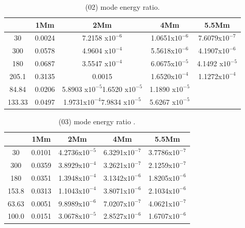 \documentclass[final,1p]{elsarticle}
\begin{document}
\begin{table}
\centering
\begin{tabular}{c c c c c }
\hline
   &  1Mm & 2Mm & 4Mm & 5.5Mm \\
\hline
30 &  0.0024 & 7.2158 x$10^{-6}$ & 1.0651x$10^{-6}$ & 7.6079x$10^{-7}$\\
\hline
300 & 0.0578 & 4.9604 x$10^{-4}$ & 5.5618x$10^{-6}$ & 4.1907x$10^{-6}$\\
\hline
180 & 0.0687 & 3.5547 x$10^{-4}$ & 6.0675x$10^{-5}$ & 4.1492 x$10^{-5}$\\
\hline
205.1 & 0.3135 & 0.0015 &1.6520x$10^{-4}$ & 1.1272x$10^{-4}$\\
\hline
84.84 & 0.0206 &5.8903 x$10^{-5}$1.6520 x$10^{-5}$ & 1.1890 x$10^{-5}$\\
\hline
133.33 & 0.0497 & 1.9731x$10^{-4}$7.9834 x$10^{-5}$ & 5.6267 x$10^{-5}$\\
\hline
\end{tabular} 
\caption{ (02) mode energy ratio.}
\end{table}




\begin{table}
\centering
\begin{tabular}{c c c c c }
\hline
   &  1Mm & 2Mm & 4Mm & 5.5Mm \\
\hline
30 &  0.0101 &  4.2736x$10^{-5}$ & 6.3291x$10^{-7}$ & 3.7786x$10^{-7}$\\
\hline
300 & 0.0359 & 3.8929x$10^{-4}$ & 3.2621x$10^{-7}$ & 2.1259x$10^{-7}$\\
\hline
180 & 0.0351 &1.3948x$10^{-4}$ & 3.1342x$10^{-6}$ & 1.8205x$10^{-6}$\\
\hline
153.8 & 0.0313 & 1.1043x$10^{-4}$ & 3.8071x$10^{-6}$ & 2.1034x$10^{-6}$\\
\hline
63.63 & 0.0051 & 9.8989x$10^{-6}$ & 7.0207x$10^{-7}$ & 4.0621x$10^{-7}$\\
\hline
100.0 & 0.0151 & 3.0678x$10^{-5}$ & 2.8527x$10^{-6}$ & 1.6707x$10^{-6}$\\
\hline
\end{tabular} 
\caption{ (03) mode energy ratio .}
\end{table}
\end{document}
